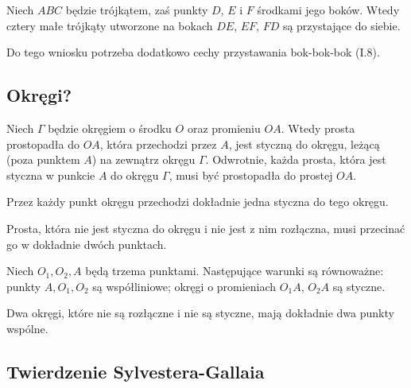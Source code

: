 \begin{corollary}
	Niech $ABC$ będzie trójkątem, zaś punkty $D$, $E$ i $F$ środkami jego boków.
	Wtedy cztery małe trójkąty utworzone na bokach $DE$, $EF$, $FD$ są przystające do siebie.
\end{corollary}

Do tego wniosku potrzeba dodatkowo cechy przystawania bok-bok-bok (I.8).
%

\subsection{Okręgi?}
\begin{proposition}
    Niech $\Gamma$ będzie okręgiem o środku $O$ oraz promieniu $OA$.
    Wtedy prosta prostopadła do $OA$, która przechodzi przez $A$, jest styczną do okręgu, leżącą (poza punktem $A$) na zewnątrz okręgu $\Gamma$.
    Odwrotnie, każda prosta, która jest styczna w punkcie $A$ do okręgu $\Gamma$, musi być prostopadła do prostej $OA$.
\end{proposition} %

\begin{corollary}
    Przez każdy punkt okręgu przechodzi dokładnie jedna styczna do tego okręgu.
\end{corollary} %

\begin{corollary}
    Prosta, która nie jest styczna do okręgu i nie jest z nim rozłączna, musi przecinać go w dokładnie dwóch punktach.
\end{corollary} %

\begin{proposition}
    Niech $O_1, O_2, A$ będą trzema punktami.
    Następujące warunki są równoważne: punkty $A, O_1, O_2$ są współliniowe; okręgi o promieniach $O_1A$, $O_2A$ są styczne.
\end{proposition} %

\begin{corollary}
    Dwa okręgi, które nie są rozłączne i nie są styczne, mają dokładnie dwa punkty wspólne.
\end{corollary} %

%
\subsection{Twierdzenie Sylvestera-Gallaia}

%

%